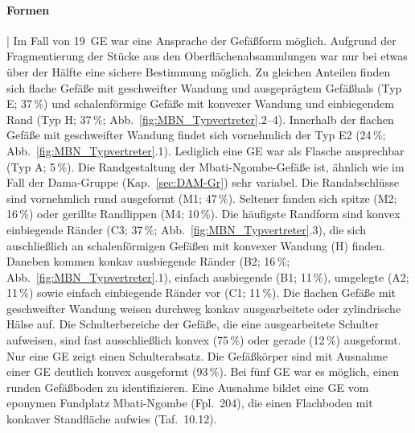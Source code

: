 \paragraph{Formen}\hspace{-.5em}|\hspace{.5em}%
Im Fall von 19~GE war eine Ansprache der Gefäßform möglich. Aufgrund der Fragmentierung der Stücke aus den Oberflächenabsammlungen war nur bei etwas über der Hälfte eine sichere Bestimmung möglich. Zu gleichen Anteilen finden sich flache Gefäße mit geschweifter Wandung und ausgeprägtem Gefäßhals (Typ E; 37\,\%) und schalenförmige Gefäße mit konvexer Wandung und einbiegendem Rand (Typ H; 37\,\%; Abb.~\ref{fig:MBN_Typvertreter}.2--4). Innerhalb der flachen Gefäße mit geschweifter Wandung findet sich vornehmlich der Typ E2 (24\,\%; Abb.~\ref{fig:MBN_Typvertreter}.1). Lediglich eine GE war als Flasche ansprechbar (Typ A; 5\,\%). Die Randgestaltung der Mbati-Ngombe-Gefäße ist, ähnlich wie im Fall der Dama-Gruppe (Kap.~\ref{sec:DAM-Gr}) sehr variabel. Die Randabschlüsse sind vornehmlich rund ausgeformt (M1; 47\,\%). Seltener fanden sich spitze (M2; 16\,\%) oder gerillte Randlippen (M4; 10\,\%). Die häufigste Randform sind konvex einbiegende Ränder (C3; 37\,\%; Abb.~\ref{fig:MBN_Typvertreter}.3), die sich auschließlich an schalenförmigen Gefäßen mit konvexer Wandung (H) finden. Daneben kommen konkav ausbiegende Ränder (B2; 16\,\%; Abb.~\ref{fig:MBN_Typvertreter}.1), einfach ausbiegende (B1; 11\,\%), umgelegte (A2; 11\,\%) sowie einfach einbiegende Ränder vor (C1; 11\,\%). Die flachen Gefäße mit geschweifter Wandung weisen durchweg konkav ausgearbeitete oder zylindrische Hälse auf. Die Schulterbereiche der Gefäße, die eine ausgearbeitete Schulter aufweisen, sind fast ausschließlich konvex (75\,\%) oder gerade (12\,\%) ausgeformt. Nur eine GE zeigt einen Schulterabsatz. Die Gefäßkörper sind mit Ausnahme einer GE deutlich konvex ausgeformt (93\,\%). Bei fünf GE war es möglich, einen runden Gefäßboden zu identifizieren. Eine Ausnahme bildet eine GE vom eponymen Fundplatz Mbati-Ngombe (Fpl.~204), die einen Flachboden mit konkaver Standfläche aufwies (Taf.~10.12).


